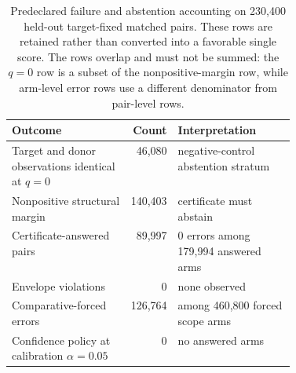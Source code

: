 \begin{table}[!ht]
\centering
\caption{Predeclared failure and abstention accounting on
230,400 held-out target-fixed matched pairs. These rows are
retained rather than converted into a favorable single score. The rows
overlap and must not be summed: the $q=0$ row is a subset of the
nonpositive-margin row, while arm-level error rows use a different
denominator from pair-level rows.}
\label{tab:v05-failure-accounting}
\small
\begin{tabularx}{\linewidth}{@{}p{0.42\linewidth}rX@{}}
\toprule
Outcome & Count & Interpretation \\
\midrule
Target and donor observations identical at $q=0$ & 46,080 & negative-control abstention stratum \\
Nonpositive structural margin & 140,403 & certificate must abstain \\
Certificate-answered pairs & 89,997 & 0 errors among 179,994 answered arms \\
Envelope violations & 0 & none observed \\
Comparative-forced errors & 126,764 & among 460,800 forced scope arms \\
Confidence policy at calibration $\alpha=0.05$ & 0 & no answered arms \\
\bottomrule
\end{tabularx}
\end{table}
